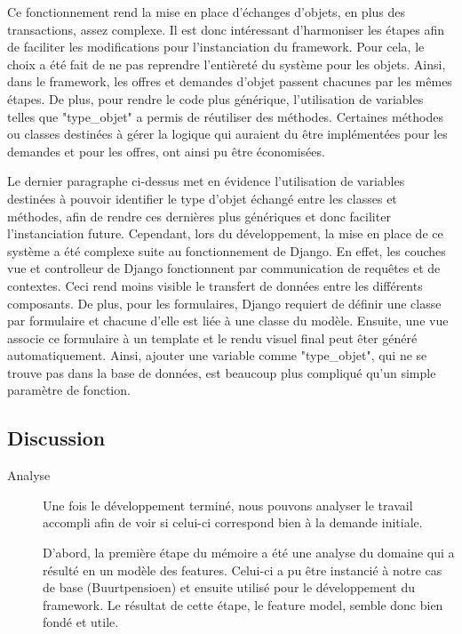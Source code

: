 {\begin{description}
Ce fonctionnement rend la mise en place d'échanges d'objets,  en plus des transactions,  assez complexe.  Il est donc intéressant d'harmoniser les étapes afin de faciliter les modifications pour l'instanciation du framework.  Pour cela,  le choix a été fait de ne pas reprendre l'entièreté du système pour les objets.  Ainsi,  dans le framework,  les offres et demandes d'objet passent chacunes par les mêmes étapes.  De plus,  pour rendre le code plus générique,  l'utilisation de variables telles que "type\_objet" a permis de réutiliser des méthodes.  Certaines méthodes ou classes destinées à gérer la logique qui auraient du être implémentées pour les demandes et pour les offres,  ont ainsi pu être économisées.  

\item[Communication entre la couche Vue et la couche Controlleur]

Le dernier paragraphe ci-dessus met en évidence l'utilisation de variables destinées à pouvoir identifier le type d'objet échangé entre les classes et méthodes,  afin de rendre ces dernières plus génériques et donc faciliter l'instanciation future.  Cependant,  lors du développement,  la mise en place de ce système a été complexe suite au fonctionnement de Django.  En effet,  les couches vue et controlleur de Django fonctionnent par communication de requêtes et de contextes.  Ceci rend moins visible le transfert de données entre les différents composants.  De plus,  pour les formulaires,  Django requiert de définir une classe par formulaire et chacune d'elle est liée à une classe du modèle.  Ensuite,  une vue associe ce formulaire à un template et le rendu visuel final peut êter généré automatiquement.  Ainsi,  ajouter une variable comme "type\_objet",  qui ne se trouve pas dans la base de données,  est beaucoup plus compliqué qu'un simple paramètre de fonction.  

\end{description}


\subsection{Discussion}

\begin{description}

\item[Analyse] 
Une fois le développement terminé,  nous pouvons analyser le travail accompli afin de voir si celui-ci correspond bien à la demande initiale.  

D'abord,  la première étape du mémoire a été une analyse du domaine qui a résulté en un modèle des features.  Celui-ci a pu être instancié à notre cas de base (Buurtpensioen) et ensuite utilisé pour le développement du framework.  Le résultat de cette étape,  le feature model,  semble donc bien fondé et utile.


\end{description}}
